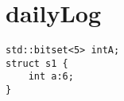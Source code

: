 \section{dailyLog} 
\begin{lstlisting}
std::bitset<5> intA;
struct s1 {
    int a:6;
}

\end{lstlisting}

